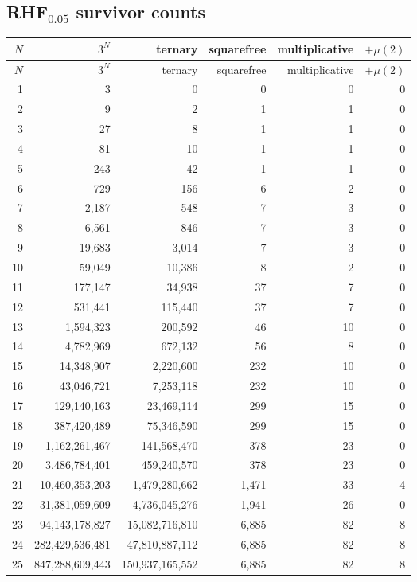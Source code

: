 \documentclass[11pt]{article}
\begin{document}
\subsection{RHF$_{0.05}$ survivor counts}
\begin{center}\scriptsize\begin{longtable}{r r r r r r}
\toprule $N$ & $3^N$ & ternary & squarefree & multiplicative & $+\mu(2)$\\ \midrule\endfirsthead
\toprule $N$ & $3^N$ & ternary & squarefree & multiplicative & $+\mu(2)$\\ \midrule\endhead
1 & 3 & 0 & 0 & 0 & 0\\
2 & 9 & 2 & 1 & 1 & 0\\
3 & 27 & 8 & 1 & 1 & 0\\
4 & 81 & 10 & 1 & 1 & 0\\
5 & 243 & 42 & 1 & 1 & 0\\
6 & 729 & 156 & 6 & 2 & 0\\
7 & 2{,}187 & 548 & 7 & 3 & 0\\
8 & 6{,}561 & 846 & 7 & 3 & 0\\
9 & 19{,}683 & 3{,}014 & 7 & 3 & 0\\
10 & 59{,}049 & 10{,}386 & 8 & 2 & 0\\
11 & 177{,}147 & 34{,}938 & 37 & 7 & 0\\
12 & 531{,}441 & 115{,}440 & 37 & 7 & 0\\
13 & 1{,}594{,}323 & 200{,}592 & 46 & 10 & 0\\
14 & 4{,}782{,}969 & 672{,}132 & 56 & 8 & 0\\
15 & 14{,}348{,}907 & 2{,}220{,}600 & 232 & 10 & 0\\
16 & 43{,}046{,}721 & 7{,}253{,}118 & 232 & 10 & 0\\
17 & 129{,}140{,}163 & 23{,}469{,}114 & 299 & 15 & 0\\
18 & 387{,}420{,}489 & 75{,}346{,}590 & 299 & 15 & 0\\
19 & 1{,}162{,}261{,}467 & 141{,}568{,}470 & 378 & 23 & 0\\
20 & 3{,}486{,}784{,}401 & 459{,}240{,}570 & 378 & 23 & 0\\
21 & 10{,}460{,}353{,}203 & 1{,}479{,}280{,}662 & 1{,}471 & 33 & 4\\
22 & 31{,}381{,}059{,}609 & 4{,}736{,}045{,}276 & 1{,}941 & 26 & 0\\
23 & 94{,}143{,}178{,}827 & 15{,}082{,}716{,}810 & 6{,}885 & 82 & 8\\
24 & 282{,}429{,}536{,}481 & 47{,}810{,}887{,}112 & 6{,}885 & 82 & 8\\
25 & 847{,}288{,}609{,}443 & 150{,}937{,}165{,}552 & 6{,}885 & 82 & 8\\
\bottomrule\end{longtable}\end{center}
\end{document}
